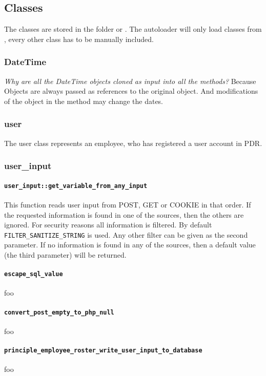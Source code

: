 \subsection{Classes}
The classes are stored in the folder  or .
The autoloader will only load classes from , every other class has to be manually included.

\subsubsection{DateTime}
\emph{Why are all the DateTime objects cloned as input into all the methods?}
Because Objects are always passed as references to the original object.
And modifications of the object in the method may change the dates.

\subsubsection{user}
The user class represents an employee, who has registered a user account in PDR.

\subsubsection{user\_input}
\paragraph{\lstinline|user_input::get_variable_from_any_input|}
This function reads user input from POST, GET or COOKIE in that order.
If the requested information is found in one of the sources, then the others are ignored.
For security reasons all information is filtered. By default \lstinline|FILTER_SANITIZE_STRING| is used. Any other filter can be given as the second parameter.
If no information is found in any of the sources, then a default value (the third parameter) will be returned.

\paragraph{\lstinline|escape_sql_value|} foo
\paragraph{\lstinline|convert_post_empty_to_php_null|} foo
\paragraph{\lstinline|principle_employee_roster_write_user_input_to_database|} foo

